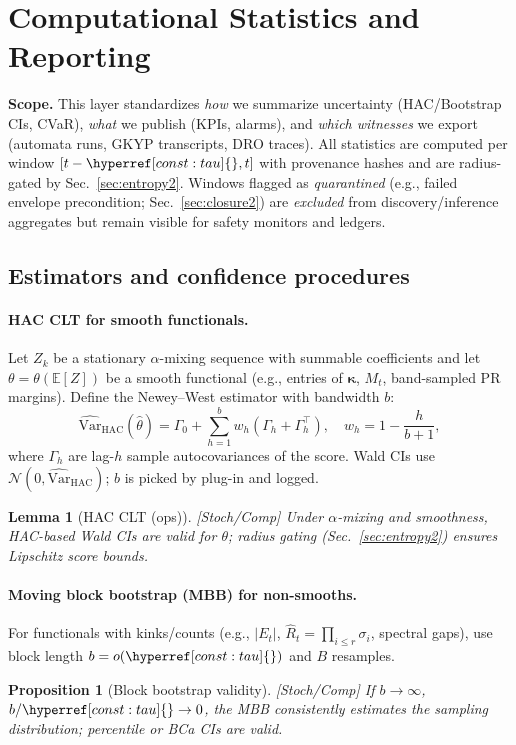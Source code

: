 \documentclass[10pt]{article}
\newcommand{\layertag}[1]{\textup{[#1]}}
\newcommand{\constref}[1]{\hyperref[const:#1]{\ensuremath{\csname constsym#1\endcsname}}}
\newtheorem{lemma}{Lemma}
\newtheorem{proposition}{Proposition}
\begin{document}
\section{Computational Statistics and Reporting}\label{sec:stats2}

\noindent\textbf{Scope.}
This layer standardizes \emph{how} we summarize uncertainty (HAC/Bootstrap CIs, CVaR), \emph{what} we publish (KPIs, alarms), and \emph{which witnesses} we export (automata runs, GKYP transcripts, DRO traces). All statistics are computed per window $[t-\constref{tau},t]$ with provenance hashes and are radius-gated by Sec.~\ref{sec:entropy2}. Windows flagged as \emph{quarantined} (e.g., failed envelope precondition; Sec.~\ref{sec:closure2}) are \emph{excluded} from discovery/inference aggregates but remain visible for safety monitors and ledgers.

\subsection*{Estimators and confidence procedures}

\paragraph{HAC CLT for smooth functionals.}
Let $Z_k$ be a stationary $\alpha$-mixing sequence with summable coefficients and let $\theta=\theta(\mathbb E[Z])$ be a smooth functional (e.g., entries of $\bm\kappa$, $M_t$, band-sampled PR margins).
Define the Newey–West estimator with bandwidth $b$:
\[
\widehat{\mathrm{Var}}_{\mathrm{HAC}}(\hat\theta)
=\Gamma_0+\sum_{h=1}^{b}w_h(\Gamma_h+\Gamma_h^\top),
\quad
w_h=1-\frac{h}{b+1},
\]
where $\Gamma_h$ are lag-$h$ sample autocovariances of the score.
Wald CIs use $\mathcal N(0,\widehat{\mathrm{Var}}_{\mathrm{HAC}})$; $b$ is picked by plug-in and logged.

\begin{lemma}[HAC CLT (ops)]\label{lem:hac2}
\emph{\layertag{Stoch/Comp}}
Under $\alpha$-mixing and smoothness, HAC-based Wald CIs are valid for $\theta$; radius gating (Sec.~\ref{sec:entropy2}) ensures Lipschitz score bounds.
\end{lemma}

\paragraph{Moving block bootstrap (MBB) for non-smooths.}
For functionals with kinks/counts (e.g., $|E_t|$, $\widehat R_t=\prod_{i\le r}\sigma_i$, spectral gaps),
use block length $b=o(\constref{tau})$ and $B$ resamples.
\begin{proposition}[Block bootstrap validity]\label{prop:bb2}
\emph{\layertag{Stoch/Comp}}
If $b\to\infty$, $b/\constref{tau}\to 0$, the MBB consistently estimates the sampling distribution; percentile or BCa CIs are valid.
\end{proposition}
\end{document}
